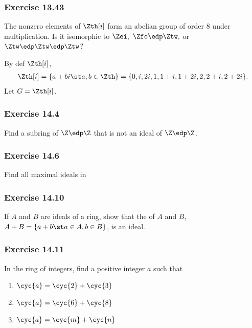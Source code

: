\documentclass{article}
\begin{document}
\subsubsection*{Exercise 13.43}
The nonzero elements of \( \Zth[i] \) form an abelian group of order 8 under multiplication. Is it isomorphic to \( \Zei,\ \Zfo\edp\Ztw, \) or \( \Ztw\edp\Ztw\edp\Ztw \)?

\begin{solution} %
  By def \( \Zth[i] \), \begin{align*}
    \Zth[i] = \{a+bi \st a,b\in\Zth\} = \{0, i, 2i, 1, 1+i, 1+2i, 2, 2+i, 2+2i\}.
  \end{align*}
  Let \( G = \Zth[i] \).
\end{solution}

\subsubsection*{Exercise 14.4}
Find a subring of \( \Z\edp\Z \) that is not an ideal of \( \Z\edp\Z \).

\begin{solution} %
\end{solution}

\subsubsection*{Exercise 14.6}
Find all maximal ideals in

 \Zei \qquad {}  \qquad {}  \qquad {}\Zn

\begin{solution} %
\end{solution}

\subsubsection*{Exercise 14.10}
If \( A \) and \( B \) are ideals of a ring, show that the  of \( A \) and \( B \), \( A+B = \{a+b\st a\in A,b\in B\} \), is an ideal.

\begin{solution} %
\end{solution}


\subsubsection*{Exercise 14.11}
In the ring of integers, find a positive integer \( a \) such that
\begin{enumerate}[label=\bd{\alph*.}]
  \item \( \cyc{a} = \cyc{2} + \cyc{3} \)
  \item \( \cyc{a} = \cyc{6} + \cyc{8} \)
  \item \( \cyc{a} = \cyc{m} + \cyc{n} \)
\end{enumerate}
\end{document}
